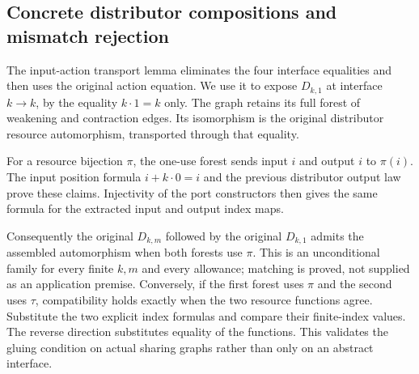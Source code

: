 
\subsection{Concrete distributor compositions and mismatch rejection}
The input-action transport lemma eliminates the four interface equalities and
then uses the original action equation. We use it to expose $D_{k,1}$ at interface
$k\to k$, by the equality $k\cdot1=k$ only. The graph retains its full forest of
weakening and contraction edges. Its isomorphism is the original distributor
resource automorphism, transported through that equality.


For a resource bijection $\pi$, the one-use forest sends input $i$ and
output $i$ to $\pi(i)$. The input position formula $i+k\cdot0=i$ and the previous
distributor output law prove these claims. Injectivity of the port constructors
then gives the same formula for the extracted input and output index maps.


Consequently the original $D_{k,m}$ followed by the original $D_{k,1}$
admits the assembled automorphism when both forests use $\pi$. This is an
unconditional family for every finite $k,m$ and every allowance; matching is
proved, not supplied as an application premise. Conversely, if the first forest
uses $\pi$ and the second uses $\tau$, compatibility holds exactly when the two
resource functions agree. Substitute the two explicit index formulas and compare
their finite-index values. The reverse direction substitutes equality of the
functions. This validates the gluing condition on actual sharing graphs rather
than only on an abstract interface.

